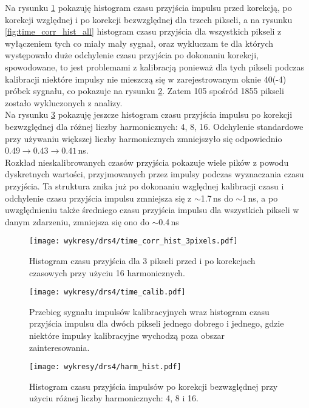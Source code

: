 \documentclass[a4paper,11pt,twoside]{article}
\begin{document}
Na rysunku \ref{fig:time_corr_hist3} pokazuję histogram czasu przyjścia impulsu przed korekcją, po korekcji względnej i po korekcji bezwzględnej dla trzech pikseli, a na rysunku \ref{fig:time_corr_hist_all} histogram czasu przyjścia dla wszystkich pikseli z wyłączeniem tych co miały mały sygnał, oraz wykluczam te dla których występowało duże odchylenie czasu przyjścia po dokonaniu korekcji, spowodowane, to jest problemami z kalibracją ponieważ dla tych pikseli podczas kalibracji niektóre impulsy nie mieszczą się w zarejestrowanym oknie 40(-4) próbek sygnału, co pokazuje na rysunku \ref{fig:time_calib}. Zatem 105 spośród 1855 pikseli zostało wykluczonych z analizy.  \\
Na rysunku \ref{fig:hist_harm} pokazuję jeszcze histogram czasu przyjścia impulsu po korekcji bezwzględnej dla różnej liczby harmonicznych: 4, 8, 16. Odchylenie standardowe przy używaniu większej liczby harmonicznych zmniejszyło się odpowiednio $0.49 \rightarrow 0.43 \rightarrow 0.41$\,ns. \\
Rozkład nieskalibrowanych czasów przyjścia pokazuje wiele pików z powodu dyskretnych wartości, przyjmowanych przez impulsy podczas wyznaczania czasu przyjścia. Ta struktura  znika już po dokonaniu  względnej kalibracji czasu i odchylenie czasu przyjścia impulsu zmniejsza się z $\sim$1.7\,ns do $\sim$1\,ns, a po uwzględnieniu także średniego czasu przyjścia impulsu dla wszystkich pikseli w danym zdarzeniu, zmniejsza się ono do $\sim$0.4\,ns

\begin{figure}[H] 
\centering
\texttt{[image: wykresy/drs4/time\_corr\_hist\_3pixels.pdf]}
\caption{Histogram czasu przyjścia dla 3 pikseli przed i po korekcjach czasowych przy użyciu 16 harmonicznych.}
\label{fig:time_corr_hist3}
\end{figure}

\begin{figure}[H] 
\centering
\texttt{[image: wykresy/drs4/time\_calib.pdf]}
\caption{Przebieg sygnału impulsów kalibracyjnych wraz histogram czasu przyjścia impulsu dla dwóch pikseli jednego dobrego i jednego, gdzie niektóre impulsy kalibracyjne wychodzą poza obszar zainteresowania.}
\label{fig:time_calib}
\end{figure}

\begin{figure}[H] 
\centering
\texttt{[image: wykresy/drs4/harm\_hist.pdf]}
\caption{Histogram czasu przyjścia impulsów po korekcji bezwzględnej przy użyciu różnej liczby harmonicznych: 4, 8 i 16.}
\label{fig:hist_harm}
\end{figure}
\end{document}
